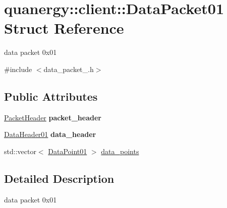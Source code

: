 \hypertarget{structquanergy_1_1client_1_1DataPacket01}{\section{quanergy\-:\-:client\-:\-:Data\-Packet01 Struct Reference}
\label{structquanergy_1_1client_1_1DataPacket01}
}


data packet 0x01  




{\ttfamily \#include $<$data\-\_\-packet\-\_.\-h$>$}

\subsection*{Public Attributes}
\begin{DoxyCompactItemize}
\item 
\hypertarget{structquanergy_1_1client_1_1DataPacket01_a172d525f8a35a635668c0f5487a740e0}{\hyperlink{structquanergy_1_1client_1_1PacketHeader}{Packet\-Header} {\bfseries packet\-\_\-header}}\label{structquanergy_1_1client_1_1DataPacket01_a172d525f8a35a635668c0f5487a740e0}

\item 
\hypertarget{structquanergy_1_1client_1_1DataPacket01_a62f6030948a11ba3c4e58fa68e7f3d1b}{\hyperlink{structquanergy_1_1client_1_1DataHeader01}{Data\-Header01} {\bfseries data\-\_\-header}}\label{structquanergy_1_1client_1_1DataPacket01_a62f6030948a11ba3c4e58fa68e7f3d1b}

\item 
std\-::vector$<$ \hyperlink{structquanergy_1_1client_1_1DataPoint01}{Data\-Point01} $>$ \hyperlink{structquanergy_1_1client_1_1DataPacket01_a399433c3f9f58954e5b7c9dd10c0232a}{data\-\_\-points}
\end{DoxyCompactItemize}


\subsection{Detailed Description}
data packet 0x01 

